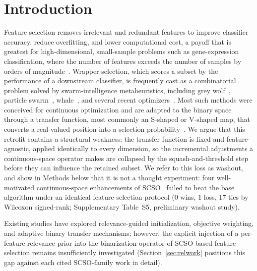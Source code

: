 \documentclass[iicol,sn-basic,pdflatex]{sn-jnl}
\begin{document}
\section{Introduction}
Feature selection removes irrelevant and redundant features to improve
classifier accuracy, reduce overfitting, and lower computational cost, a
payoff that is greatest for high-dimensional, small-sample problems such as
gene-expression classification, where the number of features exceeds the
number of samples by orders of magnitude~\cite{guyon,mrmr}. Wrapper
selection, which scores a subset by the performance of a downstream
classifier, is frequently cast as a combinatorial problem solved by
swarm-intelligence metaheuristics, including grey wolf~\cite{bgwo}, particle
swarm~\cite{pso}, whale~\cite{mafarja}, and several recent
optimizers~\cite{aoa,coa,rime}. Most such methods were conceived for
continuous optimization and are adapted to the binary space through a
transfer function, most commonly an S-shaped or V-shaped map, that converts a
real-valued position into a selection probability~\cite{tf}. We argue that
this retrofit contains a structural weakness: the transfer function is fixed
and feature-agnostic, applied identically to every dimension, so the
incremental adjustments a continuous-space operator makes are collapsed by
the squash-and-threshold step before they can influence the retained subset.
We refer to this loss as washout, and show in Methods below that it is not a
thought experiment: four well-motivated continuous-space enhancements of
SCSO~\cite{scso} failed to beat the base algorithm under an identical
feature-selection protocol (0 wins, 1 loss, 17 ties by Wilcoxon signed-rank;
Supplementary Table~S5, preliminary washout study).

Existing studies have explored relevance-guided initialization, objective
weighting, and adaptive binary transfer mechanisms; however, the explicit
injection of a per-feature relevance prior into the binarization operator of
SCSO-based feature selection remains insufficiently investigated
(Section~\ref{sec:relwork} positions this gap against each cited
SCSO-family work in detail).
\end{document}
